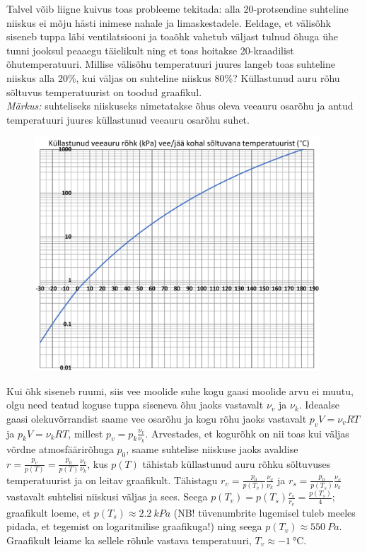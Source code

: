 
Talvel võib liigne kuivus toas probleeme tekitada: alla 20-protsendine suhteline niiskus ei mõju hästi inimese nahale ja limaskestadele. Eeldage, et välisõhk siseneb tuppa läbi ventilatsiooni ja toaõhk vahetub väljast tulnud õhuga ühe tunni jooksul peaaegu täielikult ning et toas hoitakse 20-kraadilist õhutemperatuuri. Millise välisõhu temperatuuri juures langeb toas suhteline niiskus alla 20\%, kui väljas on suhteline niiskus 80\%? Küllastunud auru rõhu sõltuvus temperatuurist on toodud graafikul.\\
\emph{Märkus:} suhteliseks niiskuseks nimetatakse õhus oleva veeauru osarõhu ja antud temperatuuri juures küllastunud veeauru osarõhu suhet.

\begin{figure}[h]
  \vspace{-1em}
  \centering
  \includegraphics[width=0.95\textwidth]{2021-lahg-04-yl.pdf}
  \vspace{-1em}
\end{figure}


\hint

\solu
Kui õhk siseneb ruumi, siis vee moolide suhe kogu gaasi moolide arvu ei muutu, olgu need teatud koguse tuppa siseneva õhu jaoks vastavalt $\nu_v$ ja $\nu_k$. Ideaalse gaasi olekuvõrrandist saame vee osarõhu ja kogu rõhu jaoks vastavalt $p_vV=\nu_vRT$ ja $p_kV=\nu_kRT$, millest $p_v = p_k\frac{\nu_v}{\nu_k}$. Arvestades, et kogurõhk on nii toas kui väljas võrdne atmosfäärirõhuga $p_0$, saame suhtelise niiskuse jaoks avaldise $r=\frac{p_v}{p(T)}=\frac{p_0}{p(T)}\frac{\nu_v}{\nu_k}$, kus $p(T)$ tähistab küllastunud auru rõhku sõltuvuses temperatuurist ja on leitav graafikult. Tähistagu $r_v=\frac{p_0}{p(T_v)}\frac{\nu_v}{\nu_k}$ ja $r_s=\frac{p_0}{p(T_s)}\frac{\nu_v}{\nu_k}$ vastavalt suhtelisi niiskusi väljas ja sees. Seega $p(T_v)=p(T_s)\frac{r_s}{r_v}=\frac{p(T_s)}{4}$; graafikult loeme, et $p(T_s)\approx \SI{2,2}{kPa}$ (NB! tüvenumbrite lugemisel tuleb meeles pidada, et tegemist on logaritmilise graafikuga!) ning seega $p(T_v)\approx\SI{550}{Pa}$. Graafikult leiame ka sellele rõhule vastava temperatuuri, $T_v \approx \SI{-1}\celsius$.
\probend